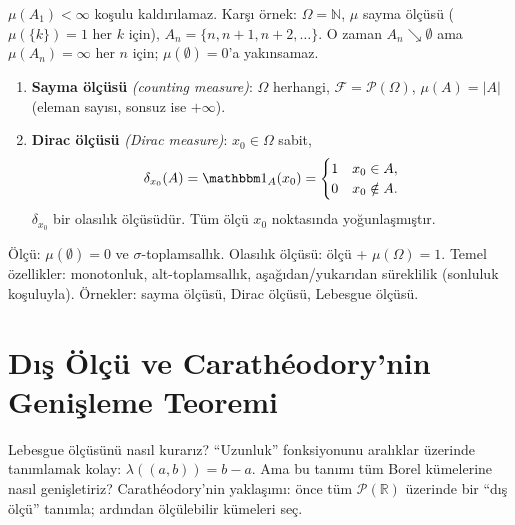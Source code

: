 \begin{hataanalizi}
$\mu(A_1) < \infty$ koşulu kaldırılamaz. Karşı örnek: $\Omega = \mathbb{N}$,
$\mu$ sayma ölçüsü ($\mu(\{k\}) = 1$ her $k$ için), $A_n = \{n, n+1, n+2, \ldots\}$.
O zaman $A_n \searrow \emptyset$ ama $\mu(A_n) = \infty$ her $n$ için; $\mu(\emptyset) = 0$'a yakınsamaz.
\end{hataanalizi}

\begin{ornek}\label{ex:saymadirac}
\begin{enumerate}[label=(\alph*)]
  \item \textbf{Sayma ölçüsü} \emph{(counting measure)}: $\Omega$ herhangi,
        $\mathcal{F} = \mathcal{P}(\Omega)$,
        $\mu(A) = |A|$ (eleman sayısı, sonsuz ise $+\infty$).

  \item \textbf{Dirac ölçüsü} \emph{(Dirac measure)}: $x_0 \in \Omega$ sabit,
        \[
          \delta_{x_0}(A) = \gostf{A}(x_0) =
          \begin{cases} 1 & x_0 \in A, \\ 0 & x_0 \notin A. \end{cases}
        \]
        $\delta_{x_0}$ bir olasılık ölçüsüdür. Tüm ölçü $x_0$ noktasında yoğunlaşmıştır.
\end{enumerate}
\end{ornek}

\begin{mikroozet}[§1.2 özeti]
Ölçü: $\mu(\emptyset)=0$ ve $\sigma$-toplamsallık. Olasılık ölçüsü: ölçü + $\mu(\Omega)=1$.
Temel özellikler: monotonluk, alt-toplamsallık, aşağıdan/yukarıdan süreklilik
(sonluluk koşuluyla). Örnekler: sayma ölçüsü, Dirac ölçüsü, Lebesgue ölçüsü.
\end{mikroozet}


\section{Dış Ölçü ve Carathéodory'nin Genişleme Teoremi}

\begin{motivasyon}[§1.3]
Lebesgue ölçüsünü nasıl kurarız? ``Uzunluk'' fonksiyonunu aralıklar üzerinde
tanımlamak kolay: $\lambda((a,b)) = b-a$. Ama bu tanımı tüm Borel kümelerine
nasıl genişletiriz? Carathéodory'nin yaklaşımı: önce tüm $\mathcal{P}(\mathbb{R})$
üzerinde bir ``dış ölçü'' tanımla; ardından ölçülebilir kümeleri seç.
\end{motivasyon}

